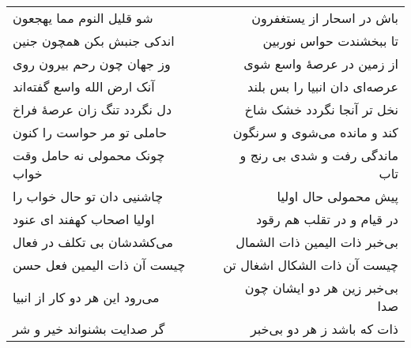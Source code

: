 \begin{center}
\begin{longtable}{l p{0.5cm} r}
شو قلیل النوم مما یهجعون
&&
باش در اسحار از یستغفرون
\\
اندکی جنبش بکن همچون جنین
&&
تا ببخشندت حواس نوربین
\\
وز جهان چون رحم بیرون روی
&&
از زمین در عرصهٔ واسع شوی
\\
آنک ارض الله واسع گفته‌اند
&&
عرصه‌ای دان انبیا را بس بلند
\\
دل نگردد تنگ زان عرصهٔ فراخ
&&
نخل تر آنجا نگردد خشک شاخ
\\
حاملی تو مر حواست را کنون
&&
کند و مانده می‌شوی و سرنگون
\\
چونک محمولی نه حامل وقت خواب
&&
ماندگی رفت و شدی بی رنج و تاب
\\
چاشنیی دان تو حال خواب را
&&
پیش محمولی حال اولیا
\\
اولیا اصحاب کهفند ای عنود
&&
در قیام و در تقلب هم رقود
\\
می‌کشدشان بی تکلف در فعال
&&
بی‌خبر ذات الیمین ذات الشمال
\\
چیست آن ذات الیمین فعل حسن
&&
چیست آن ذات الشکال اشغال تن
\\
می‌رود این هر دو کار از انبیا
&&
بی‌خبر زین هر دو ایشان چون صدا
\\
گر صدایت بشنواند خیر و شر
&&
ذات که باشد ز هر دو بی‌خبر
\\
\end{longtable}
\end{center}
